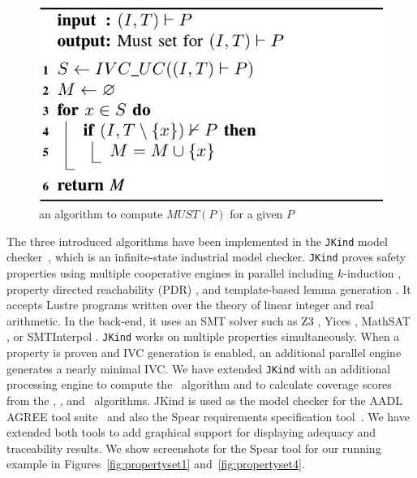 \begin{figure}
  \centering
  \includegraphics[width=0.7\columnwidth]{figs/mustalg.jpg}
  \caption{an algorithm to compute $MUST(P)$ for a given $P$}\label{alg:must}
\end{figure}
%
%
The three introduced algorithms have been implemented in the \texttt{JKind} model checker~\cite{jkind}, which is an infinite-state industrial model checker. \texttt{JKind} proves safety properties using multiple cooperative engines in parallel including $k$-induction \cite{SheeranSS00}, property directed reachability (PDR) \cite{Een2011:PDR}, and template-based lemma generation \cite{Kahsai2011}. It accepts
Lustre programs written over the theory of linear integer and real
arithmetic. In the back-end, it uses an SMT solver such as
Z3 \cite{DeMoura08:z3}, Yices \cite{Dutertre06:yices},
MathSAT \cite{Cimatti2013:MathSAT}, or SMTInterpol \cite{Christ2012:SMTInterpol}.
\texttt{JKind} works on multiple properties simultaneously. When a
property is proven and IVC generation is enabled, an additional
parallel engine generates a nearly minimal
IVC. We have extended \texttt{JKind} with an additional processing engine to compute the \mustalg\ algorithm and to calculate coverage scores from the \ucalg, \ucbfalg, and \mustalg\ algorithms. JKind is used as the model checker for the AADL AGREE tool suite~\cite{NFM2012:CoGaMiWhLaLu} and also the Spear requirements specification tool~\cite{Spear}.  We have extended both tools to add graphical support for displaying adequacy and traceability results.  We show screenshots for the Spear tool for our running example in Figures~\ref{fig:propertyset1} and~\ref{fig:propertyset4}.
